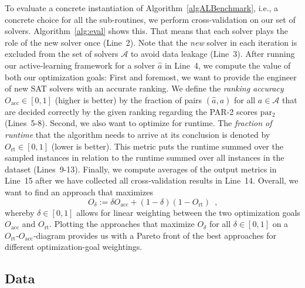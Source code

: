 \documentclass[runningheads]{llncs}
\begin{document}
To evaluate a concrete instantiation of Algorithm~\ref{algALBenchmark}, i.e., a concrete choice for all the sub-routines, we perform cross-validation on our set of solvers.
Algorithm~\ref{alg:eval} shows this.
That means that each solver plays the role of the new solver once (Line~2).
Note that the \emph{new} solver in each iteration is excluded from the set of solvers $\mathcal{A}$ to avoid data leakage (Line~3).
After running our active-learning framework for a solver $\hat{a}$ in Line~4, we compute the value of both our optimization goals:
First and foremost, we want to provide the engineer of new SAT solvers with an accurate ranking.
We define the \emph{ranking accuracy} $O_{\operatorname{acc}} \in \left[0, 1\right]$ (higher is better) by the fraction of pairs $\left(\hat{a}, a\right)$ for all $a \in \mathcal{A}$ that are decided correctly by the given ranking regarding the PAR-2 scores $\operatorname{par_2}$ (Lines~5-8).
Second, we also want to optimize for runtime.
The \emph{fraction of runtime} that the algorithm needs to arrive at its conclusion is denoted by $O_{\operatorname{rt}} \in \left[0, 1\right]$ (lower is better).
This metric puts the runtime summed over the sampled instances in relation to the runtime summed over all instances in the dataset (Lines~9-13).
Finally, we compute averages of the output metrics in Line~15 after we have collected all cross-validation results in Line~14.
Overall, we want to find an approach that maximizes
%
\begin{equation}
  O_\delta := \delta O_{\operatorname{acc}} + \left(1 - \delta\right) \left(1 - O_{\operatorname{rt}}\right) \enspace \textrm{,}
  \label{eq:opt}
\end{equation} 
%
whereby $\delta \in \left[0, 1\right]$ allows for linear weighting between the two optimization goals $O_{\operatorname{acc}}$ and $O_{\operatorname{rt}}$.
Plotting the approaches that maximize $O_\delta$ for all $\delta \in \left[0, 1\right]$ on a $O_{\operatorname{rt}}$-$O_{\operatorname{acc}}$-diagram provides us with a Pareto front of the best approaches for different optimization-goal weightings.

\subsection{Data}
\end{document}

